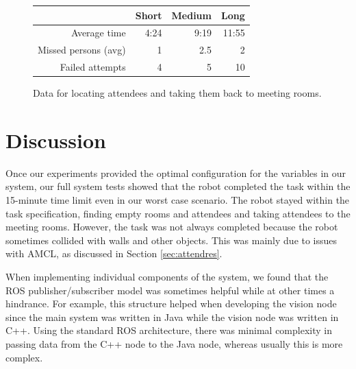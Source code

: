 \documentclass[conference]{IEEEtran}
\begin{document}
\begin{figure}
  \centering
    \begin{tabular}{r|r|r|r|}
    \cline{2-4}
    &Short&Medium&Long\\\hline
    \multicolumn{1}{|r|}{Average time}&4:24&9:19&11:55\\\hline
    \multicolumn{1}{|r|}{Missed persons (avg)}&1&2.5&2\\\hline
    \multicolumn{1}{|r|}{Failed attempts}&4&5&10\\\hline
  \end{tabular}
  \caption{Data for locating attendees and taking them back to meeting rooms.}
  \label{fig:fullsystem}
\end{figure}

\section{Discussion}
Once our experiments provided the optimal configuration for the variables in our system, our full system tests showed that the robot completed the task within the 15-minute time limit even in our worst case scenario. The robot stayed within the task specification, finding empty rooms and attendees and taking attendees to the meeting rooms. However, the task was not always completed because the robot sometimes collided with walls and other objects. This was mainly due to issues with AMCL, as discussed in Section \ref{sec:attendres}.

When implementing individual components of the system, we found that the ROS publisher/subscriber model was sometimes helpful while at other times a hindrance. For example, this structure helped when developing the vision node since the main system was written in Java while the vision node was written in C++. Using the standard ROS architecture, there was minimal complexity in passing data from the C++ node to the Java node, whereas usually this is more complex.
\end{document}
